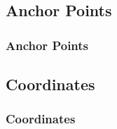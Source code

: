 {\subsection{Anchor Points}
\begin{frame}[fragile]
  \frametitle{Anchor Points}
  \vspace{3mm}
  
\end{frame}

\subsection{Coordinates}
\begin{frame}[fragile]
  \frametitle{Coordinates}
  \vspace{3mm}
  
\end{frame}

}



